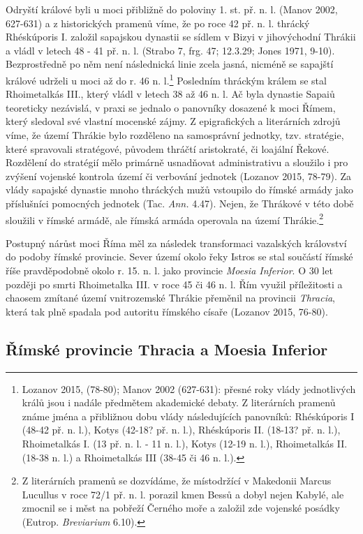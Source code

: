 Odryští králové byli u moci přibližně do poloviny 1. st. př. n. l. (Manov 2002, 627-631) a z historických pramenů víme, že po roce 42 př. n. l. thrácký Rhéskúporis I. založil sapajskou dynastii se sídlem v Bizyi v jihovýchodní Thrákii a vládl v letech 48 - 41 př. n. l. (Strabo 7, frg. 47; 12.3.29; Jones 1971, 9-10). Bezprostředně po něm není následnická linie zcela jasná, nicméně se sapajští králové udrželi u moci až do r. 46 n. l.\footnote{Lozanov 2015, (78-80); Manov 2002 (627-631): přesné roky vlády jednotlivých králů jsou i nadále předmětem akademické debaty. Z literárních pramenů známe jména a přibližnou dobu vlády následujících panovníků: Rhéskúporis I (48-42 př. n. l.), Kotys (42-18? př. n. l.), Rhéskúporis II. (18-13? př. n. l.), Rhoimetalkás I. (13 př. n. l. - 11 n. l.), Kotys (12-19 n. l.), Rhoimetalkás II. (18-38 n. l.) a Rhoimetalkás III (38-45 či 46 n. l.).} Posledním thráckým králem se stal Rhoimetalkás III., který vládl v letech 38 až 46 n. l. Ač byla dynastie Sapaiů teoreticky nezávislá, v praxi se jednalo o panovníky dosazené k moci Římem, který sledoval své vlastní mocenské zájmy. Z epigrafických a literárních zdrojů víme, že území Thrákie bylo rozděleno na samosprávní jednotky, tzv. stratégie, které spravovali stratégové, původem thráčtí aristokraté, či loajální Řekové. Rozdělení do stratégií mělo primárně usnadňovat administrativu a sloužilo i pro zvýšení vojenské kontrola území či verbování jednotek (Lozanov 2015, 78-79). Za vlády sapajské dynastie mnoho thráckých mužů vstoupilo do římské armády jako příslušníci pomocných jednotek (Tac. {\em Ann.} 4.47). Nejen, že Thrákové v této době sloužili v římské armádě, ale římská armáda operovala na území Thrákie.\footnote{Z literárních pramenů se dozvídáme, že místodržící v Makedonii Marcus Lucullus v roce 72/1 př. n. l. porazil kmen Bessů a dobyl nejen Kabylé, ale zmocnil se i měst na pobřeží Černého moře a založil zde vojenské posádky (Eutrop. {\em Breviarium} 6.10).}

Postupný nárůst moci Říma měl za následek transformaci vazalských království do podoby římské provincie. Sever území okolo řeky Istros se stal součástí římské říše pravděpodobně okolo r. 15. n. l. jako provincie {\em Moesia Inferior}. O 30 let později po smrti Rhoimetalka III. v roce 45 či 46 n. l. Řím využil příležitosti a chaosem zmítané území vnitrozemské Thrákie přeměnil na provincii {\em Thracia}, která tak plně spadala pod autoritu římského císaře (Lozanov 2015, 76-80).

\subsection[římské-provincie-thracia-a-moesia-inferior]{Římské provincie Thracia a Moesia Inferior}

